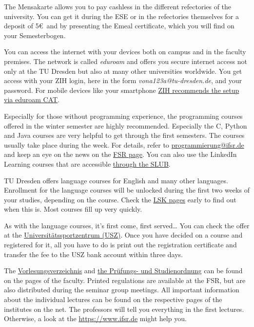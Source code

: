 \begin{itemize}
The Mensakarte allows you to pay cashless in the different refectories of the university.
You can get it during the ESE or in the refectories themselves for a deposit of 5\euro\ and by presenting the Emeal certificate, which you will find on your Semesterbogen.


You can access the internet with your devices both on campus and in the faculty premises. 
The network is called \textit{eduroam} and offers you secure internet access not only at the TU Dresden but also at many other universities worldwide. 
You get access with your ZIH login, here in the form 
   \textit{vona123a@tu-dresden.de}, 
and your password. For mobile devices like your smartphone 
\href{https://tu-dresden.de/zih/dienste/service-katalog/arbeitsumgebung/zugang_datennetz/wlan-eduroam}{%
ZIH recommends the setup via eduroam CAT}. 

Especially for those without programming experience, the programming courses offered in the winter semester are highly recommended. 
Especially the C, Python and Java courses are very helpful to get through the first semesters. 
The courses usually take place during the week.
For details, refer to \href{mailto:programmierung@ifsr.de}{programmierung@ifsr.de} and keep an eye on the news on the \href{https://www.ifsr.de}{FSR page}.
You can also use the LinkedIn Learning courses that are accessible \href{https://www.slub-dresden.de}{through the SLUB}.

\label{sec:sprache}
TU Dresden offers language courses for English and many other languages. 
Enrollment for the language courses will be unlocked during the first two weeks of your studies, depending on the course. Check the 
\href{https://lskonline.tu-dresden.de/}{LSK pages} 
early to find out when this is. Most courses fill up very quickly.

\label{sec:sport}
As with the language courses, it's first come, first served\ldots{} 
You can check the offer at the 
\href{https://tu-dresden.de/usz}{Universitätssportzentrum (USZ)}.
Once you have decided on a course and registered for it, all you have to do is print out the registration certificate and transfer the fee to the USZ bank account within three days.

The \href{https://tu-dresden.de/ing/informatik/studium/lehre}{Vorlesungsverzeichnis} and 
\href{https://tu-dresden.de/ing/informatik/studium/studienangebot}{the Prüfungs- und Studienordnung} can be found on the pages of the faculty.
Printed regulations are available at the FSR, but are also distributed during the seminar group meetings.
All important information about the individual lectures can be found on the respective pages of the institutes on the net.
The professors will tell you everything in the first lectures. 
Otherwise, a look at the \href{FSR page}{https://www.ifsr.de} might help you.


\end{itemize}
